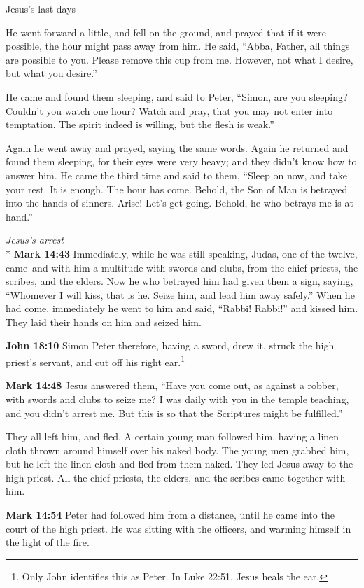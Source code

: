\documentclass[10pt,twoside]{article} %
\newcommand{\doimage}[2]{\texttt{[image: \#2]}\label{fig:#2}}
\newcommand{\figbasic}[4]{ %
    \ifthenelse{\isodd{\pageref{fig:#2}}}{}{\hfill}
    \ifstrempty{#3}{
      \doimage{#1}{#2}
    }{
      \makebox{\doimage{#1}{#2} \\ #3}
    }
    \ifthenelse{\isodd{\pageref{fig:#2}}}{\hfill}{}
    \par
}
\newcommand{\fig}[2][0.4]{
  \figbasic{#1}{#2}{}{}
}
\newcommand{\quotesize}{\normalsize{}}
\newenvironment{quotetext}{\begingroup\quotesize}{\endgroup}
\newcommand{\intex}[1]{\index[texts]{#1}}
\newcommand{\bible}[2]{\begin{quotetext}\textbf{#1}\intex{#1} #2\end{quotetext}}
\newcommand{\gospelmark}[2]{\bible{Mark #1}{#2}}
\newcommand{\john}[2]{\bible{John #1}{#2}}
\newcommand{\subhead}[1]{\emph{#1}\\*}
\begin{document}
\begin{section}{Jesus's last days}
{  He went forward a little, and fell on the ground, and prayed that if it were possible, the hour might pass away from him.   He said, ``Abba, Father, all things are possible to you. Please remove this cup from me. However, not what I desire, but what you desire.''

  He came and found them sleeping, and said to Peter, ``Simon, are you sleeping? Couldn't you watch one hour?    Watch and pray, that you may not enter into temptation. The spirit indeed is willing, but the flesh is weak.''

  Again he went away and prayed, saying the same words.   Again he returned and found them sleeping, for their eyes were very heavy; and they didn't know how to answer him.   He came the third time and said to them, ``Sleep on now, and take your rest. It is enough. The hour has come. Behold, the Son of Man is betrayed into the hands of sinners.    Arise! Let's get going. Behold, he who betrays me is at hand.''
}

\fig{judas-kiss}

\subhead{Jesus's arrest}
\gospelmark{14:43}{
  Immediately, while he was still speaking, Judas, one of the twelve, came--and with him a multitude with swords and clubs, from the chief priests, the scribes, and the elders.   Now he who betrayed him had given them a sign, saying, ``Whomever I will kiss, that is he. Seize him, and lead him away safely.''   When he had come, immediately he went to him and said, ``Rabbi! Rabbi!'' and kissed him.   They laid their hands on him and seized him.}

\john{18:10}{
  Simon Peter therefore, having a sword, drew it, struck the high priest's servant, and cut off his right ear.\footnote{Only John identifies this as Peter. In Luke 22:51, Jesus heals the ear.}
}

\gospelmark{14:48}{
  Jesus answered them, ``Have you come out, as against a robber, with swords and clubs to seize me?    I was daily with you in the temple teaching, and you didn't arrest me. But this is so that the Scriptures might be fulfilled.''

  They all left him, and fled.   A certain young man followed him, having a linen cloth thrown around himself over his naked body. The young men grabbed him,   but he left the linen cloth and fled from them naked.   They led Jesus away to the high priest. All the chief priests, the elders, and the scribes came together with him.
}

\gospelmark{14:54}{
  Peter had followed him from a distance, until he came into the court of the high priest. He was sitting with the officers, and warming himself in the light of the fire.}


\end{section}
\end{document}
